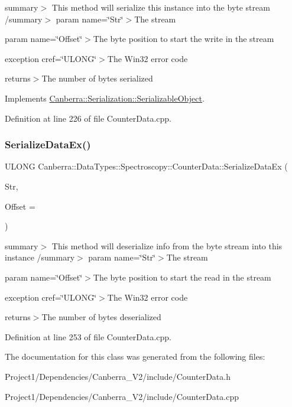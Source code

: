 summary$>$ This method will serialize this instance into the byte stream /summary$>$ param name=\char`\"{}\+Str\char`\"{}$>$The stream

param name=\char`\"{}\+Offset\char`\"{}$>$The byte position to start the write in the stream

exception cref=\char`\"{}\+U\+L\+O\+N\+G\char`\"{}$>$The Win32 error code

returns$>$The number of bytes serialized

Implements \hyperlink{class_canberra_1_1_serialization_1_1_serializable_object}{Canberra\+::\+Serialization\+::\+Serializable\+Object}.



Definition at line 226 of file Counter\+Data.\+cpp.

\mbox{\label{class_canberra_1_1_data_types_1_1_spectroscopy_1_1_counter_data_ab1cdfe42b8d4b1fde7af879bc6b92ac1_ab1cdfe42b8d4b1fde7af879bc6b92ac1}} 
\subsubsection{\texorpdfstring{Serialize\+Data\+Ex()}{SerializeDataEx()}}
{\footnotesize\ttfamily U\+L\+O\+NG Canberra\+::\+Data\+Types\+::\+Spectroscopy\+::\+Counter\+Data\+::\+Serialize\+Data\+Ex (\begin{DoxyParamCaption}\item[{\hyperlink{class_canberra_1_1_utility_1_1_core_1_1_byte_stream}{Canberra\+::\+Utility\+::\+Core\+::\+Byte\+Stream} \&}]{Str,  }\item[{const L\+O\+NG}]{Offset = {} }\end{DoxyParamCaption})}

summary$>$ This method will deserialize info from the byte stream into this instance /summary$>$ param name=\char`\"{}\+Str\char`\"{}$>$The stream

param name=\char`\"{}\+Offset\char`\"{}$>$The byte position to start the read in the stream

exception cref=\char`\"{}\+U\+L\+O\+N\+G\char`\"{}$>$The Win32 error code

returns$>$The number of bytes deserialized

Definition at line 253 of file Counter\+Data.\+cpp.



The documentation for this class was generated from the following files\+:\begin{DoxyCompactItemize}
\item 
Project1/\+Dependencies/\+Canberra\+\_\+\+V2/include/Counter\+Data.\+h\item 
Project1/\+Dependencies/\+Canberra\+\_\+\+V2/include/Counter\+Data.\+cpp\end{DoxyCompactItemize}
